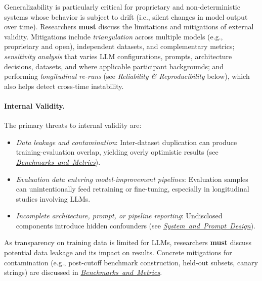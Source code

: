 \documentclass[smallextended]{svjour3}
\newcommand{\must}{\textbf{must}\xspace}
\newcommand{\design}{\hyperref[sec:report-system-and-prompt-design]{\mbox{\emph{System and Prompt Design}}}\xspace}
\newcommand{\benchmarksmetrics}{\hyperref[sec:use-suitable-baselines-benchmarks-and-metrics]{\mbox{\emph{Benchmarks and Metrics}}}\xspace}
\newcommand{\design}{\href{/guidelines/design/}{\emph{System and Prompt Design}}\xspace}
\newcommand{\benchmarksmetrics}{\href{/guidelines/benchmarks-metrics/}{\emph{Benchmarks and Metrics}}\xspace}
\newcommand{\guidelineparagraph}[1]{\paragraph{#1.}}
\newcommand{\guidelineparagraph}[1]{\paragraph{#1}}
\begin{document}
Generalizability is particularly critical for proprietary and non-deterministic systems whose behavior is subject to drift (i.e., silent changes in model output over time). Researchers \must discuss the limitations and mitigations of external validity.
Mitigations include \emph{triangulation} across multiple models (e.g., proprietary and open), independent datasets, and complementary metrics; \emph{sensitivity analysis} that varies LLM configurations, prompts, architecture decisions, datasets, and where applicable participant backgrounds; and performing \emph{longitudinal re-runs} (see \emph{Reliability \& Reproducibility} below), which also helps detect cross-time instability.

\guidelineparagraph{Internal Validity}
The primary threats to internal validity are:
\begin{itemize}
	\item \emph{Data leakage and contamination}: Inter-dataset duplication can produce training-evaluation overlap, yielding overly optimistic results (see \benchmarksmetrics).
	\item \emph{Evaluation data entering model-improvement pipelines}: Evaluation samples can unintentionally feed retraining or fine-tuning, especially in longitudinal studies involving LLMs.
	\item \emph{Incomplete architecture, prompt, or pipeline reporting}: Undisclosed components introduce hidden confounders (see \design).
\end{itemize}

As transparency on training data is limited for LLMs, researchers \must discuss potential data leakage and its impact on results. Concrete mitigations for contamination (e.g., post-cutoff benchmark construction, held-out subsets, canary strings) are discussed in \benchmarksmetrics.
\end{document}
